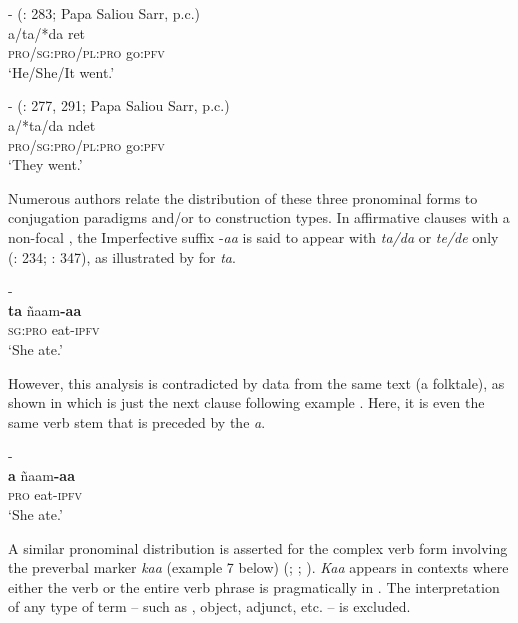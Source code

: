 \documentclass[output=paper
,newtxmath
,modfonts
,nonflat]{langsci/langscibook}
\begin{document}
\ea\label{ex:apel:4}
\ea\label{ex:apel:4a}- (\citealt{Faye1979}: 283; Papa Saliou Sarr, p.c.)\\
\gll a/ta/*da ret\\
     \textsc{pro/sg:pro/pl:pro} go:\textsc{pfv} \\
\glt ‘He/She/It went.’ 

\ex\label{ex:apel:4b}{- (\citealt{Faye1979}: 277, 291; Papa Saliou Sarr, p.c.)}\\
\gll a/*ta/da ndet \\
     \textsc{pro/sg:pro/pl:pro} go:\textsc{pfv}  \\
\glt ‘They went.’
\z
\z

Numerous authors relate the distribution of these three pronominal forms to conjugation paradigms and/or to construction types. In affirmative clauses with a non-focal , the Imperfective suffix -\textit{aa} is said to appear with \textit{ta/da} or \textit{te/de} only (\citealt{Faye1979}: 234; \citealt{Renaudier2012}: 347), as illustrated by  for \textit{ta}.

\ea\label{ex:apel:5}{- \citep[283]{Faye1979}}\\
\gll \textbf{ta} ñaam\textbf{-aa}\\
     \textsc{sg:pro} eat\textsc{-ipfv}\\
\glt ‘She ate.’
\z

However, this analysis is contradicted by data from the same text (a folktale), as shown in  which is just the next clause following example . Here, it is even the same verb stem that is preceded by the  \textit{a}.

\ea\label{ex:apel:6}{- \citep[283]{Faye1979}}\\
\gll \textbf{a} ñaam\textbf{-aa}\\
     \textsc{pro} eat\textsc{-ipfv}\\
\glt ‘She ate.’
\z

A similar pronominal distribution is asserted for the complex verb form involving the preverbal marker \textit{kaa} (example 7 below) (\citealt[234]{Faye1979}; \citealt[91f]{FayeMous06}; \citealt[348]{Renaudier2012}). \textit{Kaa} appears in contexts where either the verb or the entire verb phrase is pragmatically in . The interpretation of any type of term  -- such as , object, adjunct, etc. -- is excluded.
\end{document}
